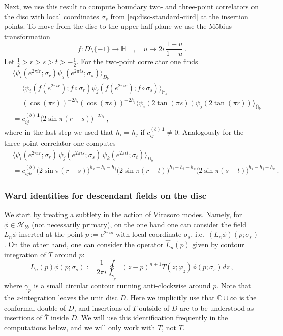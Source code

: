 \documentclass[11pt,a4paper]{article}
\numberwithin{equation}{section}
\newcommand{\one}{\mathbf{1}} %
\begin{document}
Next, we use this result to compute boundary two- and three-point correlators on the disc with local coordinates $\sigma_s$ from \eqref{eq:disc-standard-ciird} at the insertion points. To move from the disc to the upper half plane we use the Möbius transformation
\begin{equation}\label{eq:Moebius-to-UHP}
f : D \setminus \{-1\} \to \overline{\mathbb{H}}
\quad , \quad
u \mapsto 2i \,\frac{1-u}{1+u} ~.
\end{equation}
Let $\frac12>r>s>t>-\frac12$.
For the two-point correlator one finds
\begin{align}
	&\big\langle \psi_i(e^{2\pi i r};\sigma_r) \psi_j(e^{2\pi i s};\sigma_s) \big\rangle_{D_b}
	\nonumber\\
	&=
	\big\langle \psi_i(f(e^{2\pi i r}); f \circ \sigma_r) \psi_j(f(e^{2\pi i s});f \circ \sigma_s) \big\rangle_{\overline{\mathbb{H}}_b}
	\nonumber\\
	&= (\cos(\pi r))^{-2h_i}(\cos(\pi s))^{-2h_j} 
	\big\langle \psi_i(2\tan(\pi s)) \psi_j(2\tan(\pi r)) \big\rangle_{\overline{\mathbb{H}}_b}
	\nonumber\\
	&= c^{(b) \, \one}_{ij} \big(2\sin \pi(r-s)\big)^{-2 h_i} ~,
\end{align}
where in the last step we used that $h_i=h_j$ if $c^{(b) \, \one}_{ij} \neq 0$.
Analogously for the three-point correlator one computes
\begin{align}
	&\big\langle \psi_i(e^{2\pi i r};\sigma_r) \, 
	\psi_j(e^{2\pi i s};\sigma_s) \,
	\psi_k(e^{2\pi i t};\sigma_t) 
	\big\rangle_{D_b}
	\nonumber\\
	&= c^{(b)}_{ijk}  
	    \big(2\sin \pi(r-s)\big)^{h_k-h_i-h_j} 
    \big(2\sin \pi(r-t)\big)^{h_j-h_i-h_k} 
    \big(2\sin \pi(s-t)\big)^{h_i-h_j-h_k} ~.
\label{eq:disc-3pt-arbitrary}
\end{align}

\subsubsection{Ward identities for descendant fields on the disc}

We start by treating a subtlety in the action of Virasoro modes. Namely, for $\phi \in \mathcal{H}_{bb}$ (not necessarily primary), on the one hand one can consider the field $L_n \phi$ inserted at the point $p := e^{2\pi i s}$ with local coordinate $\sigma_s$, i.e.\ $(L_n \phi)(p;\sigma_s)$. On the other hand, one can consider the operator $\widehat{L}_n(p)$ given by contour integration of $T$ around $p$:
\begin{equation}
\widehat{L}_n(p) \phi(p;\sigma_s)
:=
\frac{1}{2 \pi i} \oint_{\gamma_p} (z-p)^{n+1} T(z;\varphi_z) \phi(p;\sigma_s) dz ~,
\end{equation}
where $\gamma_p$ is a small circular contour running anti-clockwise around $p$.
Note that the $z$-integration leaves the unit disc $D$. Here we implicitly use that $\mathbb{C} \cup \infty$ is the conformal double of $D$, and insertions of $T$ outside of $D$ are to be understood as insertions of $\bar T$ inside $D$. We will use this identification frequently in the computations below, and we will only work with $T$, not $\bar T$.
\end{document}
